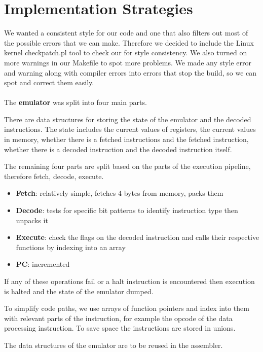 \documentclass[11pt]{article}
\begin{document}
\section{Implementation Strategies}

We wanted a consistent style for our code and one that also filters out most of
the possible errors that we can make. Therefore we decided to include the Linux
kernel checkpatch.pl tool to check our for style consistency. We also turned on
more warnings in our Makefile to spot more problems. We made any style error and
warning along with compiler errors into errors that stop the build, so we can
spot and correct them easily. \\ \\

The \textbf{emulator} was split into four main parts.

There are data structures for storing the state of the emulator and the
decoded instructions. The state includes the current values of registers, the
current values in memory, whether there is a fetched instructions and the
fetched instruction, whether there is a decoded instruction and the decoded
instruction itself.

The remaining four parts are split based on the parts of the execution pipeline,
therefore fetch, decode, execute.

\begin{itemize}[noitemsep,topsep=0pt]
    \item \textbf{Fetch}: relatively simple, fetches 4 bytes from memory, packs them
    \item \textbf{Decode}: tests for specific bit patterns to identify instruction type
      then unpacks it
    \item \textbf{Execute}: check the flags on the decoded instruction and calls their
      respective functions by indexing into an array
    \item \textbf{PC}: incremented
\end{itemize}

If any of these operations fail or a halt instruction is encountered then
execution is halted and the state of the emulator dumped.

To simplify code paths, we use arrays of function pointers and index into them
with relevant parts of the instruction, for example the opcode of the data
processing instruction. To save space the instructions are stored in unions.

The data structures of the emulator are to be reused in the assembler. \\
\end{document}
